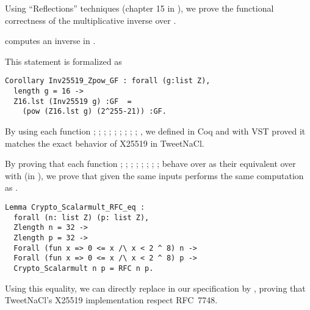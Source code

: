 Using ``Reflections'' techniques (chapter 15 in \cite{CpdtJFR}), we prove
the functional correctness of the multiplicative inverse over \Zfield.
\begin{lemma}
\label{cor:inv_comput_field}
 computes an inverse in \Zfield.
\end{lemma}
This statement is formalized as
\begin{lstlisting}[language=Coq]
Corollary Inv25519_Zpow_GF : forall (g:list Z),
  length g = 16 ->
  Z16.lst (Inv25519 g) :GF  =
    (pow (Z16.lst g) (2^255-21)) :GF.
\end{lstlisting}

\begin{sloppypar}
By using each function ; ; ; ;
; ; ; ; ;
, we defined in Coq  and with VST
proved it matches the exact behavior of X25519 in TweetNaCl.
\end{sloppypar}

\begin{sloppypar}
By proving that each function ; ; ;
; ; ; ;
;  behave over  as their equivalent
over  with  (in \Zfield), we prove that given the same inputs
 performs the same computation as .
\end{sloppypar}

\begin{lstlisting}[language=Coq]
Lemma Crypto_Scalarmult_RFC_eq :
  forall (n: list Z) (p: list Z),
  Zlength n = 32 ->
  Zlength p = 32 ->
  Forall (fun x => 0 <= x /\ x < 2 ^ 8) n ->
  Forall (fun x => 0 <= x /\ x < 2 ^ 8) p ->
  Crypto_Scalarmult n p = RFC n p.
\end{lstlisting}

Using this equality, we can directly replace  in our
specification by , proving that TweetNaCl's X25519 implementation
respect RFC~7748.




